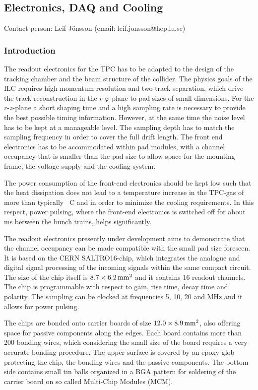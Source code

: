 \subsection{Electronics, DAQ and Cooling}\label{chap:TPC_sec:electronics}
Contact person: Leif J{\"o}nsson (email: leif.jonsson@hep.lu.se)\\

\subsubsection{Introduction}
The readout electronics for the TPC has to be adapted to the design of the tracking chamber and the beam structure of the collider. The physics goals of the ILC requires high momentum resolution and two-track separation, which drive the track reconstruction in the $r\text{-}\varphi$-plane to pad sizes of small dimensions. For the $r\text{-}z$-plane a short shaping time and a high sampling rate is necessary to provide the best possible timing information. However, at the same time the noise level has to be kept at a manageable level. The sampling depth has to match the sampling frequency in order to cover the full drift length. The front end electronics has to be accommodated within pad modules, with a channel occupancy that is smaller than the pad size to allow space for the mounting frame, the voltage supply and the cooling system.

The power consumption of the front-end electronics should be kept low such that the heat dissipation does not lead to a temperature increase in the TPC-gas of more than typically \unit[1]{\textdegree C} and in order to minimize the cooling requirements. In this respect, power pulsing, where the front-end electronics is switched off for about \unit[199]{ms} between the bunch trains, helps significantly.

The readout electronics presently under development aims to demonstrate that the channel occupancy can be made compatible with the small pad size foreseen. It is based on the CERN SALTRO16-chip, which integrates the analogue and digital signal processing of the incoming signals within the same compact circuit. The size of the chip itself is $8.7 \times \unit[6.2]{mm^2}$ and it contains 16 readout channels. The chip is programmable with respect to gain, rise time, decay time and polarity. The sampling can be clocked at frequencies 5, 10, 20 and \unit[40]{MHz} and it allows for power pulsing.

\noindent The chips are bonded onto carrier boards of size $12.0 \times \unit[8.9]{mm^2}$, also offering space for passive components along the edges. Each board contains more than 200 bonding wires, which considering the small size of the board requires a very accurate bonding procedure. The upper surface is covered by an epoxy glob protecting the chip, the bonding wires and the passive components. The bottom side contains small tin balls organized in a BGA pattern for soldering of the carrier board on so called Multi-Chip Modules (MCM).

